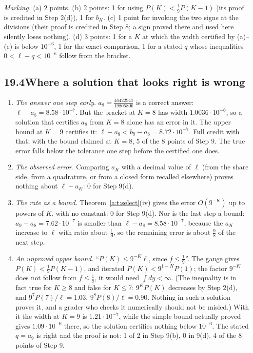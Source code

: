 \documentclass[11pt]{article}
\theoremstyle{plain}
\theoremstyle{definition}
\theoremstyle{remark}
\begin{document}
\smallskip\noindent\emph{Marking.} (a) 2 points. (b) 2 points: 1 for using $P(K)<\frac19P(K-1)$ (its proof is credited in Step 2(d)), 1 for $b_K$. (c) 1 point for invoking the two signs at the divisions (their proof is credited in Step 8; a sign proved there and used here silently loses nothing). (d) 3 points: 1 for a $K$ at which the width certified by (a)--(c) is below $10^{-6}$, 1 for the exact comparison, 1 for a stated $q$ whose inequalities $0<\ell-q<10^{-6}$ follow from the bracket.

\subsection*{19.4\quad Where a solution that looks right is wrong}

\begin{enumerate}[label=\arabic*.]
\item \emph{The answer one step early.} $a_8=\frac{46422941}{19805800}$ is a correct answer: $\ell-a_8=8.58\cdot10^{-7}$. But the bracket at $K=8$ has width $1.0036\cdot10^{-6}$, so a solution that certifies $a_8$ from $K=8$ alone has an error in it. The upper bound at $K=9$ certifies it: $\ell-a_8<b_9-a_8=8.72\cdot10^{-7}$. Full credit with that; with the bound claimed at $K=8$, 5 of the 8 points of Step 9. The true error falls below the tolerance one step before the certified one does.
\item \emph{The observed error.} Comparing $a_K$ with a decimal value of $\ell$ (from the share side, from a quadrature, or from a closed form recalled elsewhere) proves nothing about $\ell-a_K$: 0 for Step 9(d).
\item \emph{The rate as a bound.} Theorem~\ref{a:t:select}(iv) gives the error $O(9^{-K})$ up to powers of $K$, with no constant: 0 for Step 9(d). Nor is the last step a bound: $a_9-a_8=7.62\cdot10^{-7}$ is smaller than $\ell-a_8=8.58\cdot10^{-7}$, because the $a_K$ increase to $\ell$ with ratio about $\frac19$, so the remaining error is about $\frac98$ of the next step.
\item \emph{An unproved upper bound.} ``$P(K)\le9^{-K}\ell$, since $f\le\frac19$''. The gauge gives $P(K)<\frac19P(K-1)$, and iterated $P(K)<9^{1-K}P(1)$; the factor $9^{-K}$ does not follow from $f\le\frac19$, it would need $\int dy<\infty$. (The inequality is in fact true for $K\ge8$ and false for $K\le7$: $9^KP(K)$ decreases by Step 2(d), and $9^7P(7)/\ell=1.03$, $9^8P(8)/\ell=0.90$. Nothing in such a solution proves it, and a grader who checks it numerically should not be misled.) With it the width at $K=9$ is $1.21\cdot10^{-7}$, while the simple bound actually proved gives $1.09\cdot10^{-6}$ there, so the solution certifies nothing below $10^{-6}$. The stated $q=a_9$ is right and the proof is not: 1 of 2 in Step 9(b), 0 in 9(d), 4 of the 8 points of Step 9.

\end{enumerate}
\end{document}
